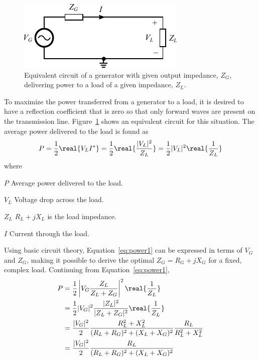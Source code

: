 \begin{figure}[htbp]
    \centering
    \includegraphics{img/analysis/generator_load}
    \caption{Equivalent circuit of a generator with given output impedance, $Z_G$, delivering power to a load of a given impedance, $Z_L$.}
    \label{fig:generator_load}
\end{figure}

To maximize the power transferred from a generator to a load, it is desired to have a reflection coefficient that is zero so that only forward waves are present on the transmission line. Figure~\ref{fig:generator_load} shows an equivalent circuit for this situation. The average power delivered to the load is found as \cite{pozar2011microwave}
\begin{equation}
    \label{eq:power1}
    P = \frac{1}{2} \real{V_LI^*} = \frac{1}{2} \real{\frac{|V_L|^2}{Z_L}}
    = \frac{1}{2} |V_L|^2 \real{\frac{1}{Z_L}}
\end{equation}
where
\begin{where}
\item[$P$] Average power delivered to the load.
\item[$V_L$] Voltage drop across the load.
\item[$Z_L$] $R_L+jX_L$ is the load impedance.
\item[$I$] Current through the load.
\end{where}
Using basic circuit theory, Equation~\ref{eq:power1} can be expressed in terms of $V_G$ and $Z_G$, making it possible to derive the optimal $Z_G = R_G+jX_G$ for a fixed, complex load. Continuing from Equation~\ref{eq:power1},
\begin{equation}
    \begin{aligned}
        P &= \frac{1}{2} \left| V_G \frac{Z_L}{Z_L+Z_G} \right|^2 \real{\frac{1}{Z_L}} \\
        &= \frac{1}{2} |V_G|^2 \frac{|Z_L|^2}{|Z_L+Z_G|^2} \real{\frac{1}{Z_L}}\\
        &= \frac{|V_G|^2}{2} \frac{R_L^2+X_L^2}{(R_L+R_G)^2+(X_L+X_G)^2} \frac{R_L}{R_L^2 + X_L^2}\\
        &= \frac{|V_G|^2}{2} \frac{R_L}{(R_L+R_G)^2 + (X_L+X_G)^2}
    \end{aligned}
\end{equation}
